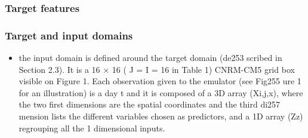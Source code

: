 \documentclass[a4paper,11pt,oneside]{report}
\begin{document}



\subsubsection{Target features}


\subsubsection{Target and input domains}
\begin{itemize}
    \item the input domain is defined around the target domain (de253 scribed in Section 2.3). It is a 16 × 16 ( J = I = 16 in Table 1) CNRM-CM5 grid box visible on Figure 1. Each observation given to the emulator (see Fig255 ure 1 for an illustration) is a day t and it is composed of a 3D array (Xi,j,x), where the two first dimensions are the spatial coordinates and the third di257 mension lists the different variables chosen as predictors, and a 1D array (Zz) regrouping all the 1 dimensional inputs.
\end{itemize}
\end{document}
